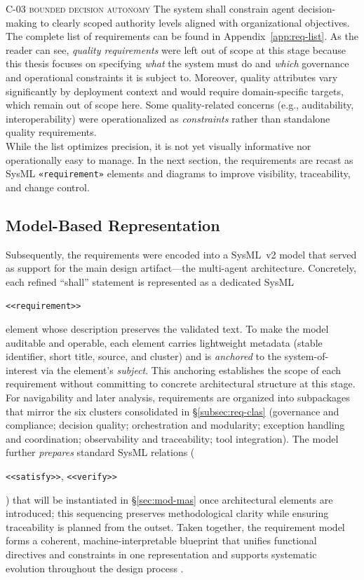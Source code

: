 \noindent \textsc{C-03 bounded decision autonomy} \quad The system shall constrain agent decision-making to clearly scoped authority levels aligned with organizational objectives. \\

The complete list of requirements can be found in Appendix~\ref{app:req-list}. As the reader can see, \emph{quality requirements} were left out of scope at this stage because this thesis focuses on specifying \emph{what} the system must do and \emph{which} governance and operational constraints it is subject to. Moreover, quality attributes vary significantly by deployment context and would require domain-specific targets, which remain out of scope here. Some quality-related concerns (e.g., auditability, interoperability) were operationalized as \emph{constraints} rather than standalone quality requirements. \\

While the list optimizes precision, it is not yet visually informative nor operationally easy to manage. In the next section, the requirements are recast as SysML \texttt{«requirement»} elements and diagrams to improve visibility, traceability, and change control.

\subsection{Model-Based Representation}\label{subsec:req-model}
Subsequently, the requirements were encoded into a SysML~v2 model that served as support for the main design artifact---the multi-agent architecture. Concretely, each refined \enquote{shall} statement is represented as a dedicated SysML \begin{footnotesize}\texttt{<<requirement>>}\end{footnotesize} element whose description preserves the validated text. To make the model auditable and operable, each element carries lightweight metadata (stable identifier, short title, source, and cluster) and is \emph{anchored} to the system-of-interest via the element's \emph{subject}. This anchoring establishes the scope of each requirement without committing to concrete architectural structure at this stage. For navigability and later analysis, requirements are organized into subpackages that mirror the six clusters consolidated in §\ref{subsec:req-clas} (governance and compliance; decision quality; orchestration and modularity; exception handling and coordination; observability and traceability; tool integration). The model further \emph{prepares} standard SysML relations (\begin{footnotesize}\texttt{<<satisfy>>}, \texttt{<<verify>>}\end{footnotesize}) that will be instantiated in §\ref{sec:mod-mas} once architectural elements are introduced; this sequencing preserves methodological clarity while ensuring traceability is planned from the outset. Taken together, the requirement model forms a coherent, machine-interpretable blueprint that unifies functional directives and constraints in one representation and supports systematic evolution throughout the design process \parencite{IEEEStandard1990}. %

